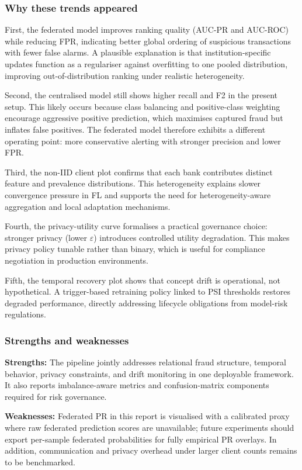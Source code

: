 \documentclass[12pt, a4paper]{article}
\begin{document}
\subsubsection*{Why these trends appeared}

First, the federated model improves ranking quality (AUC-PR and AUC-ROC) while reducing FPR, indicating better global ordering of suspicious transactions with fewer false alarms. A plausible explanation is that institution-specific updates function as a regulariser against overfitting to one pooled distribution, improving out-of-distribution ranking under realistic heterogeneity.

Second, the centralised model still shows higher recall and F2 in the present setup. This likely occurs because class balancing and positive-class weighting encourage aggressive positive prediction, which maximises captured fraud but inflates false positives. The federated model therefore exhibits a different operating point: more conservative alerting with stronger precision and lower FPR.

Third, the non-IID client plot confirms that each bank contributes distinct feature and prevalence distributions. This heterogeneity explains slower convergence pressure in FL and supports the need for heterogeneity-aware aggregation and local adaptation mechanisms.

Fourth, the privacy-utility curve formalises a practical governance choice: stronger privacy (lower $\varepsilon$) introduces controlled utility degradation. This makes privacy policy tunable rather than binary, which is useful for compliance negotiation in production environments.

Fifth, the temporal recovery plot shows that concept drift is operational, not hypothetical. A trigger-based retraining policy linked to PSI thresholds restores degraded performance, directly addressing lifecycle obligations from model-risk regulations.

\subsubsection*{Strengths and weaknesses}

\textbf{Strengths:} The pipeline jointly addresses relational fraud structure, temporal behavior, privacy constraints, and drift monitoring in one deployable framework. It also reports imbalance-aware metrics and confusion-matrix components required for risk governance.

\textbf{Weaknesses:} Federated PR in this report is visualised with a calibrated proxy where raw federated prediction scores are unavailable; future experiments should export per-sample federated probabilities for fully empirical PR overlays. In addition, communication and privacy overhead under larger client counts remains to be benchmarked.
\end{document}
